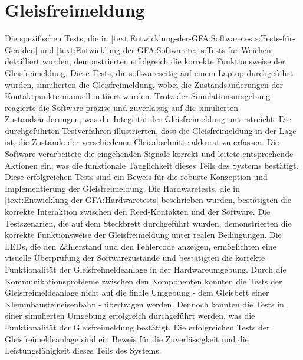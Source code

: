 \section{Gleisfreimeldung}\label{text:Auswertung:Gleisfreimeldung}

Die spezifischen Tests, die in \autoref{text:Entwicklung-der-GFA:Softwaretests:Tests-für-Geraden}  und \autoref{text:Entwicklung-der-GFA:Softwaretests:Tests-für-Weichen}  detailliert wurden, demonstrierten erfolgreich die korrekte Funktionsweise der Gleisfreimeldung. Diese Tests, die softwareseitig auf einem Laptop durchgeführt wurden, simulierten die Gleisfreimeldung, wobei die Zustandsänderungen der Kontaktpunkte manuell initiiert wurden. Trotz der Simulationsumgebung reagierte die Software präzise und zuverlässig auf die simulierten Zustandsänderungen, was die Integrität der Gleisfreimeldung unterstreicht.
\newline
Die durchgeführten Testverfahren illustrierten, dass die Gleisfreimeldung in der Lage ist, die Zustände der verschiedenen Gleisabschnitte akkurat zu erfassen. Die Software verarbeitete die eingehenden Signale korrekt und leitete entsprechende Aktionen ein, was die funktionale Tauglichkeit dieses Teils des Systems bestätigt. Diese erfolgreichen Tests sind ein Beweis für die robuste Konzeption und Implementierung der Gleisfreimeldung.
\newline
Die Hardwaretests, die in \autoref{text:Entwicklung-der-GFA:Hardwaretests}  beschrieben wurden, bestätigten die korrekte Interaktion zwischen den Reed-Kontakten und der Software. Die Testszenarien, die auf dem Steckbrett durchgeführt wurden, demonstrierten die korrekte Funktionsweise der Gleisfreimeldung unter realen Bedingungen. Die LEDs, die den Zählerstand und den Fehlercode anzeigen, ermöglichten eine visuelle Überprüfung der Softwarezustände und bestätigten die korrekte Funktionalität der Gleisfreimeldeanlage in der Hardwareumgebung.
\newline
Durch die Kommunikationsprobleme zwischen den Komponenten konnten die Tests der Gleisfreimeldeanlage nicht auf die finale Umgebung - dem Gleisbett einer Klemmbausteineisenbahn - übertragen werden. Dennoch konnten die Tests in einer simulierten Umgebung erfolgreich durchgeführt werden, was die Funktionalität der Gleisfreimeldung bestätigt. Die erfolgreichen Tests der Gleisfreimeldeanlage sind ein Beweis für die Zuverlässigkeit und die Leistungsfähigkeit dieses Teils des Systems.